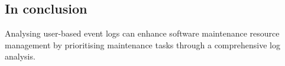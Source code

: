 \subsection{In conclusion}
Analysing user-based event logs can enhance software maintenance resource management by prioritising maintenance tasks through a comprehensive log analysis.
